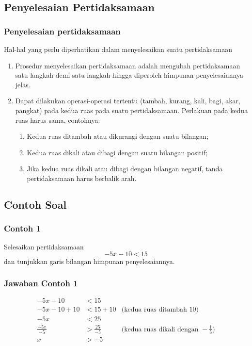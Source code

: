 \documentclass[pdflatex,compress,mathserif]{beamer}
\begin{document}
	\subsection{Penyelesaian Pertidaksamaan}
	
		\begin{frame}
			\frametitle{Penyelesaian pertidaksamaan}
			Hal-hal yang perlu diperhatikan dalam menyelesaikan suatu pertidaksamaan
			\begin{enumerate}
				\item Prosedur menyelesaikan pertidaksamaan adalah mengubah pertidaksamaan satu langkah demi satu langkah hingga diperoleh himpunan penyelesaiannya jelas.
				\item Dapat dilakukan operasi-operasi tertentu (tambah, kurang, kali, bagi, akar, pangkat) pada kedua ruas pada suatu pertidaksamaan. Perlakuan pada kedua ruas harus sama, contohnya:
				\begin{enumerate}
					\item Kedua ruas ditambah atau dikurangi dengan suatu bilangan;
					\item Kedua ruas dikali atau dibagi dengan suatu bilangan positif;
					\item Jika kedua ruas dikali atau dibagi dengan bilangan negatif, tanda pertidaksamaan harus berbalik arah.
				\end{enumerate}
			\end{enumerate}
		\end{frame}
	
	\subsection{Contoh Soal}
	
		\begin{frame}
			\frametitle{Contoh 1}
			Selesaikan pertidaksamaan
			\begin{equation*}
				-5x - 10 < 15
			\end{equation*}
			dan tunjukkan garis bilangan himpunan penyelesaiannya.
		\end{frame}
	
		\begin{frame}
			\frametitle{Jawaban Contoh 1}
			\begin{align*}
				-5x - 10 & < 15 &\\
				-5x - 10 + 10 & < 15 + 10 & \text{(kedua ruas ditambah 10)} \\
				-5x & < 25 & \\
				\frac{-5x}{-5} & > \frac{25}{-5} & \text{(kedua ruas dikali dengan } -\frac{1}{5} \text{)}\\
				x & > -5
			\end{align*}
		\end{frame}
		
\end{document}
